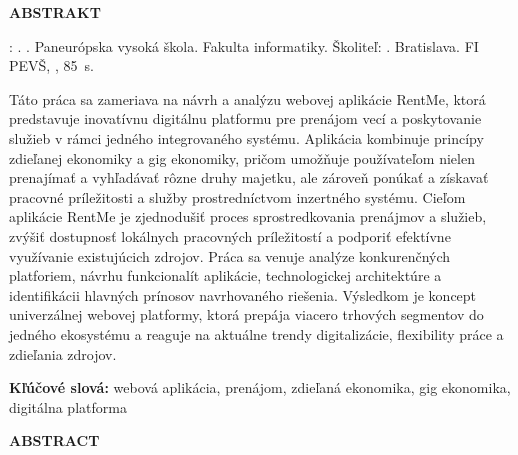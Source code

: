 \makeatletter
\thispagestyle{empty}

\noindent\textbf{ABSTRAKT}\par\vspace{1em}

\noindent\hspace*{1.5em}\MakeUppercase{\@author{}}: \@title. \thesisHeader. Paneurópska vysoká škola. Fakulta informatiky. Školiteľ: \supervisor. Bratislava. FI PEVŠ, \thesisyear, 85~s.\par\vspace{1em}

\noindent\hspace*{1.5em}Táto práca sa zameriava na návrh a analýzu webovej aplikácie RentMe, ktorá predstavuje inovatívnu digitálnu platformu pre prenájom vecí a poskytovanie služieb v rámci jedného integrovaného systému. Aplikácia kombinuje princípy zdieľanej ekonomiky a gig ekonomiky, pričom umožňuje používateľom nielen prenajímať a vyhľadávať rôzne druhy majetku, ale zároveň ponúkať a získavať pracovné príležitosti a služby prostredníctvom inzertného systému. Cieľom aplikácie RentMe je zjednodušiť proces sprostredkovania prenájmov a služieb, zvýšiť dostupnosť lokálnych pracovných príležitostí a podporiť efektívne využívanie existujúcich zdrojov. Práca sa venuje analýze konkurenčných platforiem, návrhu funkcionalít aplikácie, technologickej architektúre a identifikácii hlavných prínosov navrhovaného riešenia. Výsledkom je koncept univerzálnej webovej platformy, ktorá prepája viacero trhových segmentov do jedného ekosystému a reaguje na aktuálne trendy digitalizácie, flexibility práce a zdieľania zdrojov.\par\vspace{1em}

\noindent\hspace*{1.5em}\textbf{Kľúčové slová:} webová aplikácia, prenájom, zdieľaná ekonomika, gig ekonomika, digitálna platforma

\clearpage
\thispagestyle{empty}

\noindent\textbf{ABSTRACT}\par\vspace{1em}

